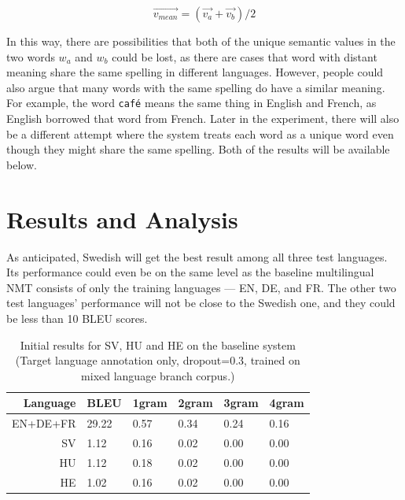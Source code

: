 \documentclass[thesis,fonts=libertine]{cluu}
\begin{document}
\begin{equation}
 \vec{v_{mean}} = (\vec{v_a} + \vec{v_b}) / 2
\end{equation}

In this way, there are possibilities that both of the unique semantic values in the two words $w_a$ and $w_b$ could be lost, as there are cases that word with distant meaning share the same spelling in different languages. However, people could also argue that many words with the same spelling do have a similar meaning. For example, the word \verb|café| means the same thing in English and French, as English borrowed that word from French. Later in the experiment, there will also be a different attempt where the system treats each word as a unique word even though they might share the same spelling. Both of the results will be available below.

\chapter{Results and Analysis}
\label{chap:results}

As anticipated, Swedish will get the best result among all three test languages. Its performance could even be on the same level as the baseline multilingual NMT consists of only the training languages --- EN, DE, and FR. The other two test languages' performance will not be close to the Swedish one, and they could be less than 10 BLEU scores.

\begin{table}
  \centering
  \begin{tabular}{|r*{5}{|l}|}
    \hline
    Language & BLEU & 1gram & 2gram & 3gram & 4gram \\ [0.25ex]
    \hline\hline
    EN+DE+FR & 29.22 & 0.57 & 0.34 & 0.24 & 0.16 \\
    \hline
    SV & 1.12 & 0.16 & 0.02 & 0.00 & 0.00 \\ 
    \hline
    HU & 1.12 & 0.18 & 0.02 & 0.00 & 0.00 \\
    \hline
    HE & 1.02 & 0.16 & 0.02 & 0.00 & 0.00 \\
    \hline
  \end{tabular}
  \caption{Initial results for SV, HU and HE on the baseline system (Target language annotation only, dropout=0.3, trained on mixed language branch corpus.)}
  \label{table:initial_results}
\end{table}
\end{document}
